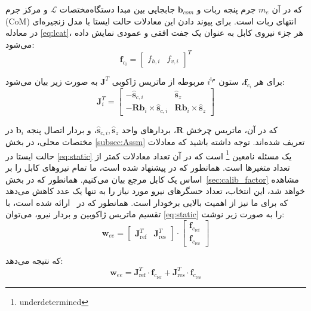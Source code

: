 که در آن $m_e$ جرم پنجه ربات و $\bm{b}_{com}$ جابجایی بین مبدا دستگاه‌مختصات $\mathcal{L}$ و مرکز جرم (CoM) انتهای ربات است. 
برای پیوند دادن این معادلات حالت ایستا با مدل زنجیره‌ای در معادله \eqref{eq:lcat}، هر جزء نیروی کابل به عنوان یک جفت افقی و عمودی نمایش داده می‌شود:  
\begin{equation}
	\mathbf{f}_{c_{i}}= \begin{bmatrix} f_{h,i} & f_{v,i} \end{bmatrix} ^T 
\end{equation}

برای هر $\mathbf{f}_{c_{i}}$، ستون $i^{ام}$ مربوطه از ماتریس ژاکوبی $\bm{J}^T$ به صورت زیر بیان می‌شود:
\begin{equation}
	\bm{J}^T_i= \begin{bmatrix} -\hat{\bm{s}}_{c,i} & \hat{\bm{s}}_{z} \\ -\bm{R}\bm{b}_{i} \times \hat{\bm{s}}_{c,i} & \bm{R}\bm{b}_{i} \times \hat{\bm{s}}_{z}  \end{bmatrix}
\end{equation}

که در آن، ماتریس چرخش $\bm{R}$، بردارهای واحد $\hat{\bm{s}}_{c,i}, \hat{\bm{s}}_{z}$، و بردار اتصال پنجه $\bm{b}_i$ در مختصات محلی، در بخش
\ref{subsec:Assm} 
تعریف شده‌اند. توجه داشته باشید که معادلات حالت ایستا در 
\ref{eq:static}
 یک مسئله نامعین
 \footnote{underdetermined}
است که در آن تعداد معادلات کمتر از تعداد متغیرها است. همانطور که در \cite{allak2022kinematics} پیشنهاد شده است، ما تمام نیروهای کابل را بر اساس یک کابل مرجع بیان می‌کنیم. همانطور که در بخش~\ref{sec:calib_factor} مشاهده خواهد شد، این انتخاب، تعداد حسگرهای نیرو مورد نیاز را به تنها یک عدد کاهش می‌دهد که برای ما نیز از اهمیت بالایی برخودار است. همانطور که در~\cite{borgstrom2009nims, allak2022kinematics} ارائه شده است، با تقسیم ماتریس ژاکوبین و بردار نیرو، می‌توان
 \ref{eq:static} 
 را به صورت زیر نوشت:
\begin{equation} \label{eq:wrench-jac-force}
	\mathbf{w}_{ee} = \begin{bmatrix} \bm{J}^T_{\text{ref}} & \bm{J}^T_{\text{res}} \end{bmatrix} \cdot \begin{bmatrix} \mathbf{f}_{c_{\text{ref}}} \\ \mathbf{f}_{c_{\text{res}}} \end{bmatrix} 
\end{equation} 

که نتیجه می‌دهد:
\begin{equation} \label{eq:jacobian-distribution}
	\mathbf{w}_{ee} = \bm{J}_{\text{ref}}^T \cdot \mathbf{f}_{c_{\text{ref}}} + \bm{J}_{\text{res}}^T \cdot \mathbf{f}_{c_{\text{res}}} 
\end{equation}

